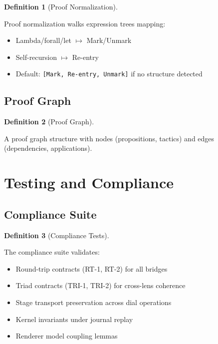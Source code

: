 \documentclass{amsart}
\theoremstyle{definition}
\newtheorem{definition}{Definition}[section]
\theoremstyle{remark}
\begin{document}
\begin{definition}[Proof Normalization]
\label{def:proof-normalize}

Proof normalization walks expression trees mapping:
\begin{itemize}
\item Lambda/forall/let $\mapsto$ Mark/Unmark
\item Self-recursion $\mapsto$ Re-entry
\item Default: \texttt{[Mark, Re-entry, Unmark]} if no structure detected
\end{itemize}
\end{definition}

\subsection{Proof Graph}
\label{sec:proof-graph}

\begin{definition}[Proof Graph]
\label{def:proof-graph}

A proof graph structure with nodes (propositions, tactics) and edges (dependencies, applications).
\end{definition}

\section{Testing and Compliance}

\subsection{Compliance Suite}
\label{sec:compliance}

\begin{definition}[Compliance Tests]
\label{def:compliance-tests}

The compliance suite validates:
\begin{itemize}
\item Round-trip contracts (RT-1, RT-2) for all bridges
\item Triad contracts (TRI-1, TRI-2) for cross-lens coherence
\item Stage transport preservation across dial operations
\item Kernel invariants under journal replay
\item Renderer model coupling lemmas
\end{itemize}
\end{definition}
\end{document}
